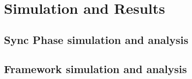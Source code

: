 \chapter{Simulation and Results}
\label{chap:simulationandresults}

\section{Sync Phase simulation and analysis}

\section{Framework simulation and analysis}
